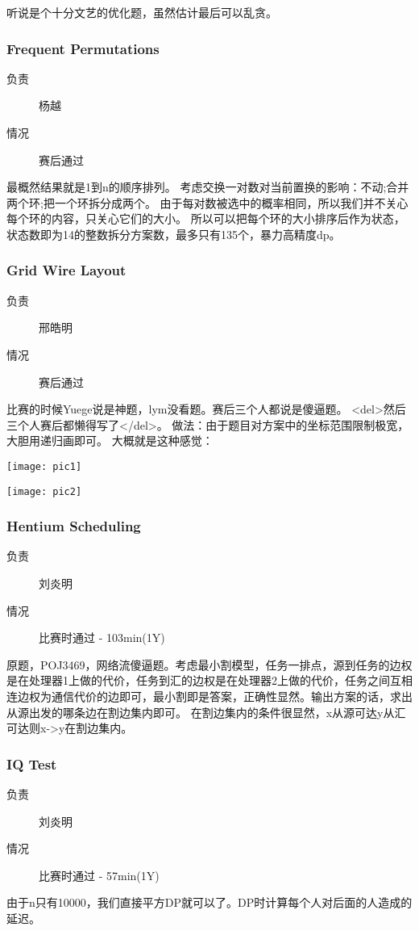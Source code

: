 \documentclass[a4paper, 11pt, nofonts, nocap, fancyhdr]{ctexart}
\newcommand{\problem}[1]{\subsubsection{#1}}
\begin{document}
听说是个十分文艺的优化题，虽然估计最后可以乱贪。

\problem{Frequent Permutations}

\begin{description}
\item[负责] 杨越
\item[情况] 赛后通过
\end{description}

最概然结果就是1到n的顺序排列。
考虑交换一对数对当前置换的影响：不动;合并两个环;把一个环拆分成两个。
由于每对数被选中的概率相同，所以我们并不关心每个环的内容，只关心它们的大小。
所以可以把每个环的大小排序后作为状态，状态数即为14的整数拆分方案数，最多只有135个，暴力高精度dp。

\problem{Grid Wire Layout}

\begin{description}
\item[负责] 邢皓明
\item[情况] 赛后通过
\end{description}

比赛的时候Yuege说是神题，lym没看题。赛后三个人都说是傻逼题。
<del>然后三个人赛后都懒得写了</del>。
做法：由于题目对方案中的坐标范围限制极宽，大胆用递归画即可。
大概就是这种感觉：

\texttt{[image: pic1]}

\texttt{[image: pic2]}

\problem{Hentium Scheduling}

\begin{description}
\item[负责] 刘炎明
\item[情况] 比赛时通过 - 103min(1Y)
\end{description}

原题，POJ3469，网络流傻逼题。考虑最小割模型，任务一排点，源到任务的边权是在处理器1上做的代价，任务到汇的边权是在处理器2上做的代价，任务之间互相连边权为通信代价的边即可，最小割即是答案，正确性显然。输出方案的话，求出从源出发的哪条边在割边集内即可。
在割边集内的条件很显然，x从源可达y从汇可达则x->y在割边集内。

\problem{IQ Test}

\begin{description}
\item[负责] 刘炎明
\item[情况] 比赛时通过 - 57min(1Y)
\end{description}

由于n只有10000，我们直接平方DP就可以了。DP时计算每个人对后面的人造成的延迟。
\end{document}
